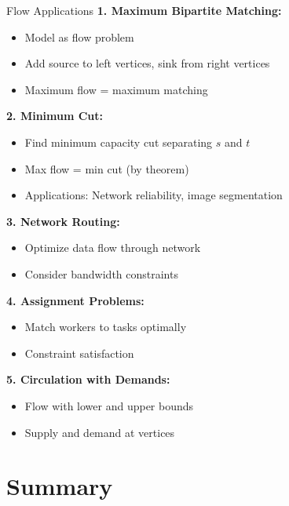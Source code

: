\documentclass[aspectratio=169]{beamer}
\begin{document}
\begin{frame}{Flow Applications}
  \textbf{1. Maximum Bipartite Matching:}
  \begin{itemize}
    \item Model as flow problem
    \item Add source to left vertices, sink from right vertices
    \item Maximum flow = maximum matching
  \end{itemize}

  \vspace{0.2cm}
  \textbf{2. Minimum Cut:}
  \begin{itemize}
    \item Find minimum capacity cut separating $s$ and $t$
    \item Max flow = min cut (by theorem)
    \item Applications: Network reliability, image segmentation
  \end{itemize}

  \vspace{0.2cm}
  \textbf{3. Network Routing:}
  \begin{itemize}
    \item Optimize data flow through network
    \item Consider bandwidth constraints
  \end{itemize}

  \vspace{0.2cm}
  \textbf{4. Assignment Problems:}
  \begin{itemize}
    \item Match workers to tasks optimally
    \item Constraint satisfaction
  \end{itemize}

  \vspace{0.2cm}
  \textbf{5. Circulation with Demands:}
  \begin{itemize}
    \item Flow with lower and upper bounds
    \item Supply and demand at vertices
  \end{itemize}
\end{frame}

\section{Summary}
\end{document}
